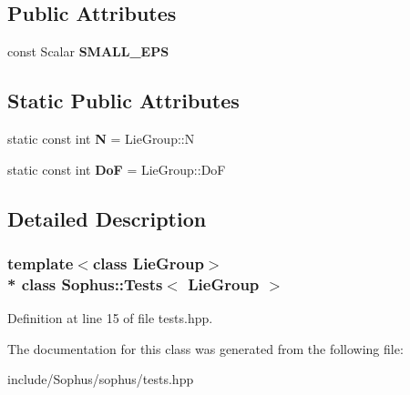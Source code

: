 \subsection*{Public Attributes}
\begin{DoxyCompactItemize}
\item 
const Scalar {\bfseries S\+M\+A\+L\+L\+\_\+\+E\+PS}\hypertarget{class_sophus_1_1_tests_a439dcadb8477274a0b2ab20f0dbc08d4}{}\label{class_sophus_1_1_tests_a439dcadb8477274a0b2ab20f0dbc08d4}

\end{DoxyCompactItemize}
\subsection*{Static Public Attributes}
\begin{DoxyCompactItemize}
\item 
static const int {\bfseries N} = Lie\+Group\+::N\hypertarget{class_sophus_1_1_tests_a8645b889a8db98096449d75c4bd603a8}{}\label{class_sophus_1_1_tests_a8645b889a8db98096449d75c4bd603a8}

\item 
static const int {\bfseries DoF} = Lie\+Group\+::\+DoF\hypertarget{class_sophus_1_1_tests_adef1c1f22b34d22187aa6838a23bfa41}{}\label{class_sophus_1_1_tests_adef1c1f22b34d22187aa6838a23bfa41}

\end{DoxyCompactItemize}


\subsection{Detailed Description}
\subsubsection*{template$<$class Lie\+Group$>$\\*
class Sophus\+::\+Tests$<$ Lie\+Group $>$}



Definition at line 15 of file tests.\+hpp.



The documentation for this class was generated from the following file\+:\begin{DoxyCompactItemize}
\item 
include/\+Sophus/sophus/tests.\+hpp\end{DoxyCompactItemize}
